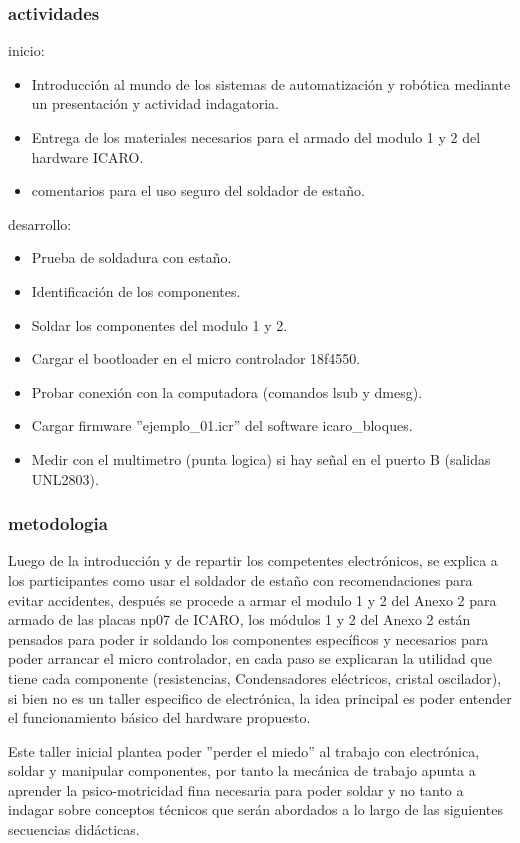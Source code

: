 \subsubsection{actividades}
inicio:
\begin{itemize}
  \item Introducción al mundo de los sistemas de automatización y robótica mediante un presentación y actividad indagatoria.
  \item Entrega de los materiales necesarios para el armado del modulo 1 y 2 del hardware ICARO.
  \item comentarios para el uso seguro del soldador de estaño.
\end{itemize}
desarrollo:
\begin{itemize}
  \item Prueba de soldadura con estaño.
  \item Identificación de los componentes.
  \item Soldar los componentes del modulo 1 y 2.
  \item Cargar el bootloader en el micro controlador 18f4550.
  \item Probar conexión con la computadora (comandos lsub y dmesg).
  \item Cargar firmware ''ejemplo\_01.icr'' del software icaro\_bloques.
  \item Medir con el multimetro (punta logica) si hay señal en el puerto B (salidas UNL2803).

\end{itemize}

\subsubsection{metodologia}

Luego de la introducción y de repartir los competentes electrónicos, se explica a los participantes como usar el soldador de estaño con recomendaciones para evitar accidentes, después se procede a armar el modulo 1 y 2 del Anexo 2 para armado de las placas np07 de ICARO, los módulos 1 y 2 del Anexo 2 están pensados para poder ir soldando los componentes específicos y necesarios para poder arrancar el micro controlador, en cada paso se explicaran la utilidad que tiene cada componente (resistencias, Condensadores eléctricos, cristal oscilador), si bien no es un taller especifico de electrónica, la idea principal es poder entender el funcionamiento básico del hardware propuesto.

Este taller inicial plantea poder ''perder el miedo'' al trabajo con electrónica, soldar y manipular componentes, por tanto la mecánica de trabajo apunta a aprender la psico-motricidad fina necesaria para poder soldar y no tanto a indagar sobre conceptos técnicos que serán abordados a lo largo de las siguientes secuencias didácticas.

